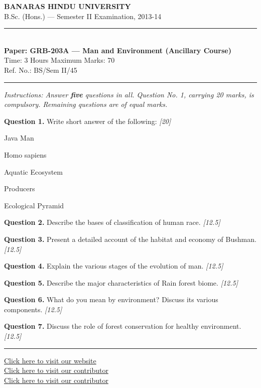 \documentclass[11pt,a4paper]{article}
\newcommand{\pts}[1]{\hfill   \textit{[#1]}}
\begin{document}
\begin{center}
  {\large\bfseries BANARAS HINDU UNIVERSITY}\\[2pt]
  {\normalsize B.Sc. (Hons.) --- Semester II Examination, 2013-14}\\[6pt]
  \rule{0.8\linewidth}{0.5pt}\\[6pt]
  {\large\bfseries Paper: GRB-203A --- Man and Environment (Ancillary Course)}\\[4pt]
  {\normalsize Time: 3 Hours \hfill Maximum Marks: 70}\\[2pt]
  {\small Ref. No.: BS/Sem II/45}
\end{center}
\rule{\linewidth}{0.4pt}
\smallskip



\noindent   \textit{Instructions: Answer   \textbf{five} questions in all. Question No. 1, carrying 20 marks, is compulsory. Remaining questions are of equal marks.}
\bigskip




\noindent   \textbf{Question 1.} Write short answer of the following: \pts{20}

\begin{parts}
  \item Java Man
  \item Homo sapiens
  \item Aquatic Ecosystem
  \item Producers
  \item Ecological Pyramid
\end{parts}

\medskip


\noindent   \textbf{Question 2.} Describe the bases of classification of human race. \pts{12.5}

\medskip


\noindent   \textbf{Question 3.} Present a detailed account of the habitat and economy of Bushman. \pts{12.5}

\medskip


\noindent   \textbf{Question 4.} Explain the various stages of the evolution of man. \pts{12.5}

\medskip


\noindent   \textbf{Question 5.} Describe the major characteristics of Rain forest biome. \pts{12.5}

\medskip


\noindent   \textbf{Question 6.} What do you mean by environment? Discuss its various components. \pts{12.5}

\medskip


\noindent   \textbf{Question 7.} Discuss the role of forest conservation for healthy environment. \pts{12.5}

\vfill\rule{\linewidth}{0.4pt}

\begin{center}\small
\href{https://bhu-exam.vercel.app/}{Click here to visit our website}\\[4pt]
\href{https://me-aryan.vercel.app/}{Click here to visit our contributor}\\[4pt]
\href{https://quashan-me.vercel.app/}{Click here to visit our contributor}
\end{center}
\end{document}
